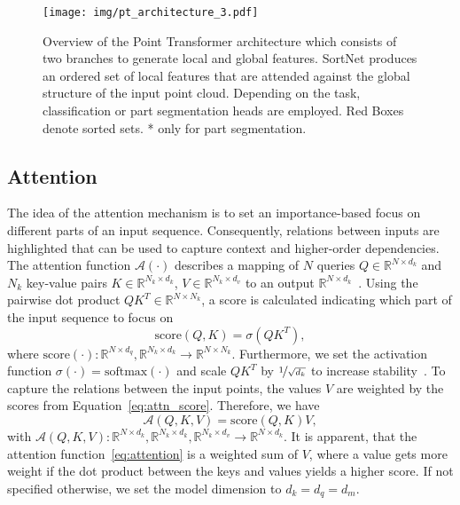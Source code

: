 \documentclass{ieeeaccess}
\begin{document}
\begin{figure*}[t]
\begin{center}
\texttt{[image: img/pt\_architecture\_3.pdf]}
\end{center}
\caption{Overview of the Point Transformer architecture which consists of two branches to generate local and global features. SortNet produces an ordered set of local features that are attended against the global structure of the input point cloud. Depending on the task, classification or part segmentation heads are employed.  Red Boxes denote sorted sets. * only for part segmentation.}
    \label{fig:point-transformer}
\end{figure*}

\subsection{Attention}
The idea of the attention mechanism is to set an importance-based focus on different parts of an input sequence. Consequently, relations between inputs are highlighted that can be used to capture context and higher-order dependencies. 
 The attention function $\mathcal{A}(\cdot)$ describes a mapping of $N$ queries $Q \in \mathbb{R}^{N \times d_k}$ and $N_k$ key-value pairs \mbox{$K\in \mathbb{R}^{N_k \times d_k}$,} \mbox{$V \in \mathbb{R}^{N_k \times d_v}$} to an output $ \mathbb{R}^{N\times d_k}$~\cite{vaswani2017attention}. 
Using the pairwise dot product $QK^T\in \mathbb{R}^{N\times N_k}$, a score is calculated indicating  which part of the input sequence to focus on
\begin{equation}\label{eq:attn_score}
    \text{score}(Q,K) =\sigma(QK^T),
\end{equation}
where $\text{score}(\cdot): \mathbb{R}^{N\times d_q},\mathbb{R}^{N_k\times d_k} \rightarrow \mathbb{R}^{N\times N_k}$. Furthermore, we set the activation function $\sigma(\cdot) = \text{softmax}(\cdot)$ and scale $QK^T$ by $\nicefrac{1}{\sqrt{d_k}}$ to increase stability~\cite{vaswani2017attention}. 
To capture the relations between the input points, the values $V$ are weighted by the scores from Equation~\eqref{eq:attn_score}. Therefore, we have
\begin{equation}\label{eq:attention} 
    \mathcal{A}(Q,K,V) =  \text{score}(Q,K)V,
\end{equation}
with $\mathcal{A}(Q,K,V) :  \mathbb{R}^{N\times d_k},  \mathbb{R}^{N_k\times d_k},  \mathbb{R}^{N_k\times d_v} \rightarrow \mathbb{R}^{N\times d_k}$. It is apparent, that the attention function~\eqref{eq:attention} is a weighted sum of $V$, where a value gets more weight if the dot product between the keys and values yields a higher score. 
If not specified otherwise, we set the model dimension to \mbox{$d_k = d_q = d_m$.}
\end{document}
